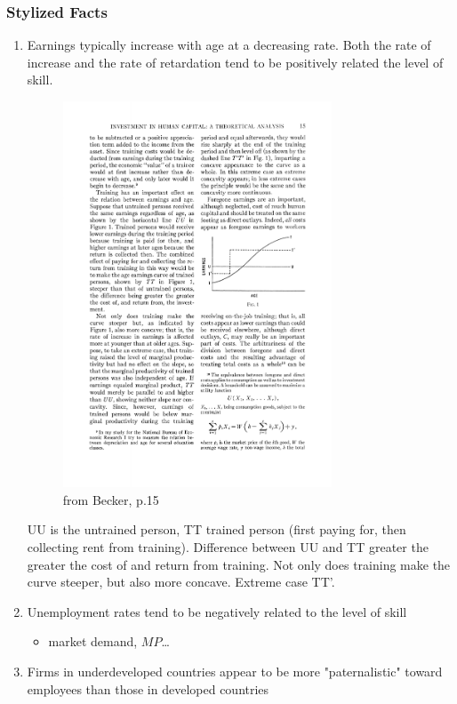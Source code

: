 \documentclass[12pt,a4paper]{article}
\begin{document}
  \subsubsection{Stylized Facts} %
  \begin{enumerate}
    \item Earnings typically increase with age at a decreasing rate. Both the rate of increase and the rate of retardation tend to be positively related the level of skill.\\
      \begin{figure}[htb]
        \centering
        \includegraphics[width=8cm]{fig1.pdf}
        \caption{from Becker, p.15}
        \label{fig1}
      \end{figure}
      UU is the untrained person, TT trained person (first paying for, then collecting rent from training). Difference between UU and TT greater the greater the cost of and return from training. Not only does training make the curve steeper, but also more concave. Extreme case TT'.
    \item Unemployment rates tend to be negatively related to the level of skill
      \begin{itemize}
        \item market demand, $MP$\dots
      \end{itemize}
    \item Firms in underdeveloped countries appear to be more
      "paternalistic" toward employees than those in developed countries

\end{enumerate}
\end{document}
